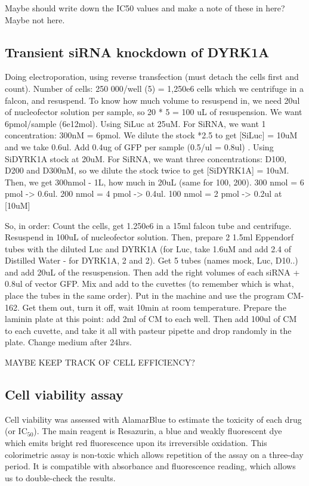 \documentclass[onecolumn,10pt]{asme2ej}
\begin{document}
Maybe should write down the IC50 values and make a note of these in here? Maybe not here. 



\subsection{Transient siRNA knockdown of DYRK1A}
Doing electroporation, using reverse transfection (must detach the cells first and count). 
Number of cells: 250 000/well (5) = 1,250e6 cells which we centrifuge in a falcon, and resuspend. To know how much volume to resuspend in, we need 20ul of nucleofector solution per sample, so 20 * 5 = 100 uL of resuspension. 
We want 6pmol/sample (6e12mol).
Using SiLuc at 25uM. For SiRNA, we want 1 concentration: 300nM = 6pmol. We dilute the stock *2.5 to get [SiLuc] = 10uM and we take 0.6ul.
Add 0.4ug of GFP per sample (0.5/ul = 0.8ul) .  
Using SiDYRK1A stock at 20uM. For SiRNA, we want three concentrations: D100, D200 and D300nM, so we dilute the stock twice to get [SiDYRK1A] = 10uM. Then, we get 300nmol - 1L, how much in 20uL (same for 100, 200).
300 nmol = 6 pmol -> 0.6ul.
200 nmol = 4 pmol -> 0.4ul.
100 nmol = 2 pmol -> 0.2ul at [10uM]


So, in order:
Count the cells, get 1.250e6 in a 15ml falcon tube and centrifuge. Resuspend in 100uL of nucleofector solution. 
Then, prepare 2 1.5ml Eppendorf tubes with the diluted Luc and DYRK1A (for Luc, take 1.6uM and add 2.4 of Distilled Water - for DYRK1A, 2 and 2). 
Get 5 tubes (names mock, Luc, D10..) and add 20uL of the resuspension. Then add the right volumes of each siRNA + 0.8ul of vector GFP. Mix and add to the cuvettes (to remember which is what, place the tubes in the same order). 
Put in the machine and use the program CM-162.
Get them out, turn it off, wait 10min at room temperature.
Prepare the laminin plate at this point: add 2ml of CM to each well.
Then add 100ul of CM to each cuvette, and take it all with pasteur pipette and drop randomly in the plate.
Change medium after 24hrs. 

MAYBE KEEP TRACK OF CELL EFFICIENCY? 

\subsection{Cell viability assay}
Cell viability was assessed with AlamarBlue to estimate the toxicity of each drug (or IC$_{50}$). The main reagent is Resazurin, a blue and weakly fluorescent dye which emits bright red fluorescence upon its irreversible oxidation. This colorimetric assay is non-toxic which allows repetition of the assay on a three-day period. It is compatible with absorbance and fluorescence reading, which allows us to double-check the results. 
\end{document}
